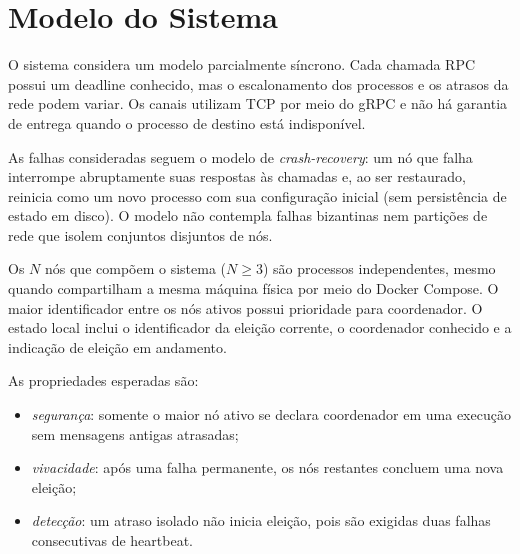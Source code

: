 \section{Modelo do Sistema}
\label{sec:modelo}

O sistema considera um modelo parcialmente síncrono. Cada chamada RPC possui
um deadline conhecido, mas o escalonamento dos processos e os atrasos da rede
podem variar. Os canais utilizam TCP por meio do gRPC e não há garantia de
entrega quando o processo de destino está indisponível.

As falhas consideradas seguem o modelo de \textit{crash-recovery}: um nó que
falha interrompe abruptamente suas respostas às chamadas e, ao ser restaurado,
reinicia como um novo processo com sua configuração inicial (sem persistência
de estado em disco). O modelo não contempla falhas bizantinas nem partições de
rede que isolem conjuntos disjuntos de nós.

Os $N$ nós que compõem o sistema ($N \ge 3$) são processos independentes,
mesmo quando compartilham a mesma máquina física por meio do Docker Compose. O
maior identificador entre os nós ativos possui prioridade para coordenador. O
estado local inclui o identificador da eleição corrente, o coordenador
conhecido e a indicação de eleição em andamento.

As propriedades esperadas são:
\begin{itemize}
    \item \textit{segurança}: somente o maior nó ativo se declara coordenador
    em uma execução sem mensagens antigas atrasadas;
    \item \textit{vivacidade}: após uma falha permanente, os nós restantes
    concluem uma nova eleição;
    \item \textit{detecção}: um atraso isolado não inicia eleição, pois são
    exigidas duas falhas consecutivas de heartbeat.
\end{itemize}
